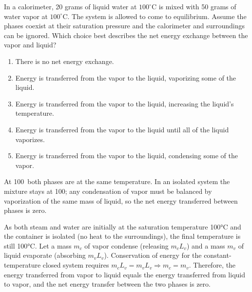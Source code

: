 \item \label{prob:6}
In a calorimeter, 20 grams of liquid water at $100^\circ$C is mixed with 50 grams of water vapor at $100^\circ$C. The system is allowed to come to equilibrium. Assume the phases coexist at their saturation pressure and the calorimeter and surroundings can be ignored. Which choice best describes the net energy exchange between the vapor and liquid?
\begin{enumerate}[label=(\Alph*)]
    \item There is no net energy exchange.
    \item Energy is transferred from the vapor to the liquid, vaporizing some of the liquid.
    \item Energy is transferred from the vapor to the liquid, increasing the liquid’s temperature.
    \item Energy is transferred from the vapor to the liquid until all of the liquid vaporizes.
    \item Energy is transferred from the vapor to the liquid, condensing some of the vapor.
\end{enumerate}

\begin{answerbox}
\end{answerbox}
\begin{insightbox}
At 100\textcelsius\ both phases are at the same temperature. In an isolated system the mixture stays at 100\textcelsius; any condensation of vapor must be balanced by vaporization of the same mass of liquid, so the net energy transferred between phases is zero.
\end{insightbox}
\begin{solutionbox}

As both steam and water are initially at the saturation temperature 100°C and the container is isolated (no heat to the surroundings), the final temperature is still 100°C. Let a mass $m_c$ of vapor condense (releasing $m_cL_v$) and a mass $m_v$ of liquid evaporate (absorbing $m_vL_v$). Conservation of energy for the constant-temperature closed system requires $m_cL_v=m_vL_v\Rightarrow m_c=m_v$. Therefore, the energy transferred from vapor to liquid equals the energy transferred from liquid to vapor, and the net energy transfer between the two phases is zero.
\end{solutionbox}

